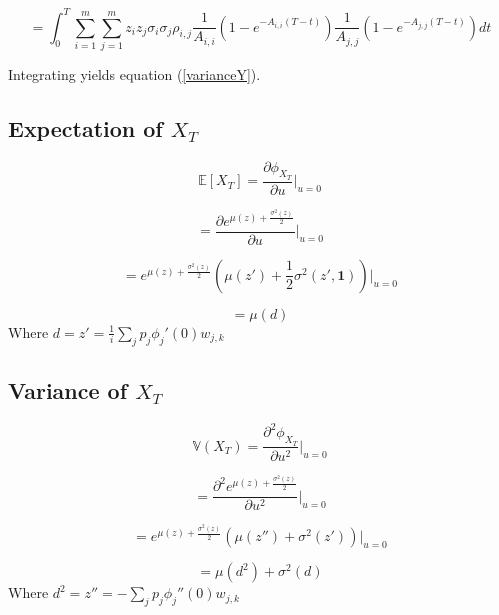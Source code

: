 \documentclass[12pt]{article}
\theoremstyle{definition}
\begin{document}
\begin{equation}
=\int_0 ^ T \sum_{i=1} ^ m \sum_{j=1} ^ m z_i z_j \sigma_i \sigma_j \rho_{i,j} \frac{1}{A_{i,i}}\left(1-e^{-{A}_{i, i}(T-t)}\right)\frac{1}{A_{j,j}}\left(1-e^{-{A}_{j, j}(T-t)}\right) dt\end{equation}

Integrating yields equation (\ref{varianceY}).
\subsection{Expectation of \(X_T\)}

\begin{equation}
\mathbb{E}[X_T]=\frac{\partial \phi_{X_T}}{\partial u} \big|_{u=0}
\end{equation}

\begin{equation}
 =\frac{\partial e^{\mu(z)+\frac{\sigma^2(z)}{2} }}{\partial u} \bigg|_{u=0}\end{equation}
 
 \begin{equation}
 = e^{\mu(z)+\frac{\sigma^2(z)}{2} } \left(\mu(z')+\frac{1}{2} \sigma^2 (z', \mathbf{1})\right) \bigg|_{u=0}\end{equation}
 
 \begin{equation}
 =\mu(d)
 \end{equation}
 Where \(d=z'=\frac{1}{i}\sum_j p_j \phi_j'(0) w_{j, k} \)
 
 \subsection{Variance of \(X_T\)}
 
\begin{equation}
\mathbb{V}(X_T)=\frac{\partial^2 \phi_{X_T}}{\partial u^2} \big|_{u=0}
\end{equation}

\begin{equation}
 =\frac{\partial ^2 e^{\mu(z)+\frac{\sigma^2(z)}{2} }}{\partial u^2} \bigg|_{u=0}\end{equation}
 
 \begin{equation}
 = e^{\mu(z)+\frac{\sigma^2(z)}{2} } \left(\mu(z'')+ \sigma^2 (z') \right) \bigg|_{u=0}\end{equation}
 
 \begin{equation}
 =\mu(d^2)+\sigma^2 (d)
 \end{equation}
 Where \(d^2=z''=-\sum_j p_j \phi_j''(0) w_{j, k} \)
 
\end{document}
